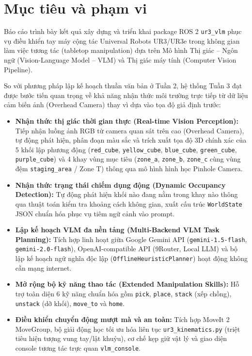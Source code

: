 \documentclass[a4paper,12pt]{article}
\begin{document}
\newpage
\tableofcontents
\newpage


\section{Mục tiêu và phạm vi}
Báo cáo trình bày kết quả xây dựng và triển khai package ROS 2 \texttt{ur3\_vlm} phục vụ điều khiển tay máy cộng tác Universal Robots UR3/UR3e trong không gian làm việc tương tác (tabletop manipulation) dựa trên Mô hình Thị giác -- Ngôn ngữ (Vision-Language Model -- VLM) và Thị giác máy tính (Computer Vision Pipeline). 

So với phương pháp lập kế hoạch thuần văn bản ở Tuần 2, hệ thống Tuần 3 đạt được bước tiến quan trọng về khả năng nhận thức môi trường trực tiếp từ dữ liệu cảm biến ảnh (Overhead Camera) thay vì dựa vào tọa độ giả định trước:
\begin{itemize}
    \item \textbf{Nhận thức thị giác thời gian thực (Real-time Vision Perception):} Tiếp nhận luồng ảnh RGB từ camera quan sát trên cao (Overhead Camera), tự động phát hiện, phân đoạn màu sắc và trích xuất tọa độ 3D chính xác của 5 khối lập phương động (\texttt{red\_cube}, \texttt{yellow\_cube}, \texttt{blue\_cube}, \texttt{green\_cube}, \texttt{purple\_cube}) và 4 khay vùng mục tiêu (\texttt{zone\_a}, \texttt{zone\_b}, \texttt{zone\_c} cùng vùng đệm \texttt{staging\_area} / Zone T) thông qua mô hình hình học Pinhole Camera.
    \item \textbf{Nhận thức trạng thái chiếm dụng động (Dynamic Occupancy Detection):} Tự động phát hiện khối nào đang nằm trong khay nào thông qua thuật toán kiểm tra khoảng cách không gian, xuất cấu trúc \texttt{WorldState} JSON chuẩn hóa phục vụ tiêm ngữ cảnh vào prompt.
    \item \textbf{Lập kế hoạch VLM đa nền tảng (Multi-Backend VLM Task Planning):} Tích hợp linh hoạt giữa Google Gemini API (\texttt{gemini-1.5-flash}, \texttt{gemini-2.0-flash}), OpenAI-compatible API (9Router, Local LLM) và bộ lập kế hoạch ngữ nghĩa độc lập (\texttt{OfflineHeuristicPlanner}) hoạt động không cần mạng internet.
    \item \textbf{Mở rộng bộ kỹ năng thao tác (Extended Manipulation Skills):} Hỗ trợ toàn diện 6 kỹ năng chuẩn hóa gồm \texttt{pick}, \texttt{place}, \texttt{stack} (xếp chồng), \texttt{unstack} (dỡ khối), \texttt{move\_to} và \texttt{home}.
    \item \textbf{Điều khiển chuyển động mượt mà và an toàn:} Tích hợp MoveIt 2 MoveGroup, bộ giải động học tối ưu hóa liên tục \texttt{ur3\_kinematics.py} (triệt tiêu hiện tượng vung tay/lật khuỷu), cơ chế kẹp giữ vật lý và giao diện console tương tác trực quan \texttt{vlm\_console}.
\end{itemize}
\end{document}
